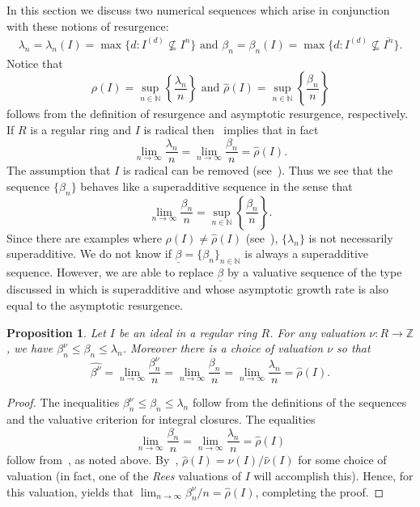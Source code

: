 \documentclass[12pt, reqno]{amsart}
\numberwithin{equation}{section}
\def\b{\ensuremath{\beta}}
\def\ub{\ensuremath{\underline{\beta}}}
\newcommand{\wrho}{\widehat{\rho}}
\newcommand{\N}{{\mathbb N}}
\newcommand{\Z}{{\mathbb Z}}
\theoremstyle{plain} %
\newtheorem{prop}[thm]{Proposition}
\theoremstyle{definition}
\theoremstyle{remark}
\begin{document}
In this section we discuss two numerical sequences which  arise in conjunction with these notions of resurgence:
\begin{eqnarray*}
\lambda_n = \lambda_n(I) = \max\{d:I^{(d)}\not\subseteq I^n\}  \text{ and }
\beta_n =\beta_n(I) =\max\{d:I^{(d)}\not\subseteq \overline{I^n}\}.
\end{eqnarray*}
Notice that
\[
\rho(I)=\sup_{n\in\N}\left\lbrace \frac{\lambda_n}{n} \right\rbrace \mbox{ and } \wrho(I)=\sup_{n\in\N} \left\lbrace \frac{\beta_n}{n} \right\rbrace
\]
follows from the definition of resurgence and asymptotic resurgence, respectively.  If $R$ is a regular ring and $I$ is radical then~\cite[Remark~5.5]{DD21} implies that in fact
\[
\lim_{n\to\infty}\frac{\lambda_n}{n}=\lim_{n\to\infty}\frac{\beta_n}{n}=\wrho(I).
\]
The assumption that $I$ is radical can be removed (see~\cite[Remark~4.23]{DD21}).  Thus we see that the sequence $\{\beta_n\}$ behaves like a superadditive sequence in the sense that
\[
\lim_{n\to\infty}\frac{\beta_n}{n}=\sup_{n\in\N}\left\lbrace \frac{\beta_n}{n}\right\rbrace.
\]
Since there are examples where $\rho(I)\neq \wrho(I)$ (see~\cite{DHNST15}), $\{\lambda_n\}$ is not necessarily superadditive.  We do not know if $\ub=\{\beta_n\}_{n\in\N}$ is always a superadditive sequence.  However, we are able to replace $\ub$ by a valuative sequence of the type discussed in  which is superadditive and whose asymptotic growth rate is also equal to the asymptotic resurgence.

\begin{prop}
\label{prop:betahat=rhohat}
Let $I$ be an ideal in a regular ring $R$.  For any valuation $\nu:R\to\Z$, we have $\beta^\nu_n\le \beta_n\le \lambda_n$.  Moreover there is a choice of valuation $\nu$ so that
\[
\widehat{\b^\nu}=\lim_{n\to\infty} \frac{\beta^\nu_n}{n}=\lim_{n\to\infty} \frac{\beta_n}{n}=\lim_{n\to\infty}\frac{\lambda_n}{n}=\wrho(I).
\]
\end{prop}
\begin{proof}
The inequalities $\beta^\nu_n\le \beta_n\le \lambda_n$ follow from the definitions of the sequences and the valuative criterion for integral closures.  The equalities
\[
\lim_{n\to\infty} \frac{\beta_n}{n}=\lim_{n\to\infty}\frac{\lambda_n}{n}=\wrho(I)
\]
follow from~\cite[Remark~5.5]{DD21}, as noted above.  By~\cite[Theorem~4.10]{DFMS}, $\wrho(I)=\nu(I)/\widehat{\nu}(I)$ for some choice of valuation (in fact, one of the \textit{Rees} valuations of $I$ will accomplish this).  Hence, for this valuation,  yields that $\lim_{n\to\infty} \beta^\nu_n/n=\wrho(I)$, completing the proof.
\end{proof}
\end{document}
